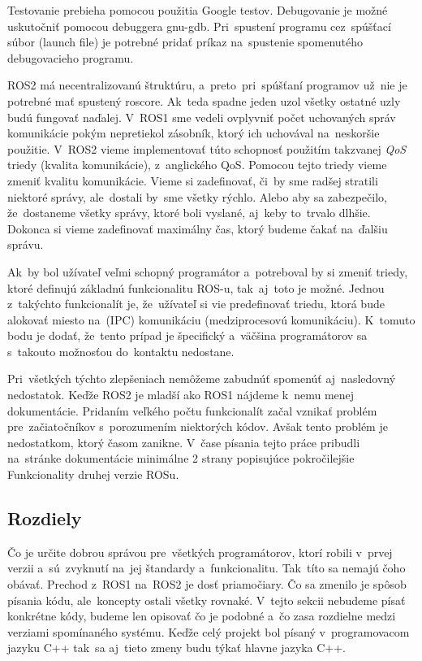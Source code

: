 Testovanie prebieha pomocou použitia Google testov. Debugovanie je možné uskutočniť pomocou debuggera gnu-gdb. Pri~spustení programu
cez~spúšťací súbor (launch file) je potrebné pridať príkaz na~spustenie spomenutého debugovacieho programu.

ROS2 má necentralizovanú štruktúru, a~preto~pri~spúšťaní programov už~nie je potrebné mať spustený roscore. Ak~teda spadne jeden uzol všetky
ostatné uzly budú fungovať naďalej. V~ROS1 sme vedeli ovplyvniť počet uchovaných správ komunikácie pokým nepretiekol zásobník, ktorý ich uchovával
na~neskoršie použitie. V~ROS2 vieme implementovať túto schopnosť použitím takzvanej \textit{QoS} triedy (kvalita komunikácie), z~anglického \acrlong{QoS}.
Pomocou tejto triedy vieme zmeniť kvalitu komunikácie. Vieme si zadefinovať, či~by sme radšej stratili niektoré správy, ale~dostali by~sme
všetky rýchlo. Alebo aby sa zabezpečilo, že~dostaneme všetky správy, ktoré boli vyslané, aj~keby to~trvalo dlhšie. Dokonca si vieme zadefinovať
maximálny čas, ktorý budeme čakať na~ďalšiu správu.

Ak~by bol užívateľ veľmi schopný programátor a~potreboval by si zmeniť triedy, ktoré definujú základnú funkcionalitu ROS-u, tak~aj~toto je možné.
Jednou z~takýchto funkcionalít je, že~užívateľ si vie predefinovať triedu, ktorá bude alokovať miesto na~(IPC) komunikáciu (medziprocesovú komunikáciu).
K~tomuto bodu je dodať, že~tento prípad je špecifický a~väčšina programátorov sa s~takouto možnosťou do~kontaktu nedostane.

Pri~všetkých týchto zlepšeniach nemôžeme zabudnúť spomenúť aj~nasledovný nedostatok. Keďže ROS2 je mladší ako ROS1 nájdeme k~nemu menej dokumentácie.
Pridaním veľkého počtu funkcionalít začal vznikať problém pre~začiatočníkov s~porozumením niektorých kódov. Avšak tento problém je nedostatkom,
ktorý časom zanikne. V~čase písania tejto práce pribudli na~stránke dokumentácie minimálne 2 strany popisujúce pokročilejšie Funkcionality druhej
verzie ROSu.

\subsection{Rozdiely}

Čo je určite dobrou správou pre~všetkých programátorov, ktorí robili v~prvej verzii a~sú~zvyknutí na~jej štandardy a~funkcionalitu. Tak~títo
sa nemajú čoho obávať. Prechod z~ROS1 na~ROS2 je dosť priamočiary. Čo sa zmenilo je spôsob písania kódu, ale~koncepty ostali všetky rovnaké.
V~tejto sekcii nebudeme písať konkrétne kódy, budeme len opisovať čo je podobné a~čo zasa rozdielne medzi verziami spomínaného systému. Keďže
celý projekt bol písaný v~programovacom jazyku C++ tak~sa aj~tieto zmeny budu týkať hlavne jazyka C++.

